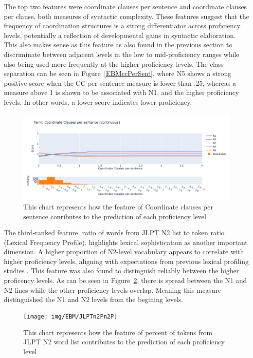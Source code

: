 The top two features were coordinate clauses per sentence and coordinate clauses per clause, both measures of
syntactic complexity. These features suggest that the frequency of coordination structures is a strong
differentiator across proficiency levels, potentially a reflection of developmental gains in syntactic elaboration. This
also makes sense as this feature as also found in the previous section to discriminate between adjacent levels in
the low to mid-proficiency ranges while also being used more frequently at the higher proficiency levels. The class
separation can be seen in Figure~\ref{EBMccPerSent}, where N5 shows a strong positive score when the CC per sentence
measure is lower than .25, whereas a measure above 1 is shown to be associated with N1, and the higher proficiency
levels. In other words, a lower score indicates lower
proficiency.

\begin{figure}[h!]
    \centering
    \includegraphics[scale=.4]{img/EBM/EBMccPerSent}
    \caption[Contribution of Coordinate Clauses per Sentence]{This chart represents how the feature of Coordinate clauses per sentence conributes to the prediction of each proficiency level}
    \label{fig:EBMccPerSent}
\end{figure}


The third-ranked feature, ratio of words from JLPT N2 list to token ratio (Lexical Frequency Profile), highlights
lexical sophistication as another important dimension. A higher proportion of N2-level vocabulary appears to
correlate with higher proficiency levels, aligning with expectations from previous lexical profiling studies
\citep{Laufer1995}. This feature was also found to distinguish reliably between the higher proficency levels. As can
be seen in Figure~\ref{fig:EBMjlptN2}, there is spread between the N1 and N2 lines while the other proficiency
levels overlap. Meaning this measure distinguished
the N1 and N2 levels from the begining levels.

\begin{figure}[h!]
    \centering
    \texttt{[image: img/EBM/JLPTn2Pn2P]}
    \caption[Contribution of percentage of tokens from JLPT N2 vocabulary list]{This chart represents how the feature of percent of tokens from JLPT N2 word list contributes to the prediction of each proficiency level}
    \label{fig:EBMjlptN2}
\end{figure}

